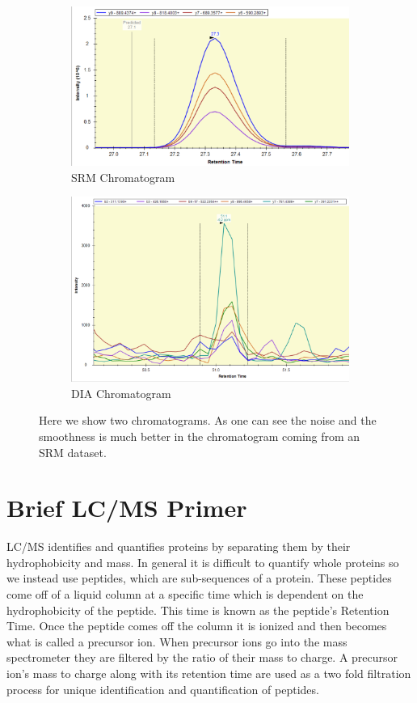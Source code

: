 \documentclass[12pt]{article}
\begin{document}
\begin{figure}
\centering
\begin{subfigure}{.5\textwidth}
  \centering
  \includegraphics[width=1\linewidth]{smoothExample.png}
  \caption{SRM Chromatogram}
  \label{fig:sub1}
\end{subfigure}%
\begin{subfigure}{.5\textwidth}
  \centering
  \includegraphics[width=1\linewidth]{DIA_example}
  \caption{DIA Chromatogram}
  \label{fig:sub2}
\end{subfigure}
\caption{Here we show two chromatograms. As one can see the noise and the smoothness is much better in the chromatogram coming from an SRM dataset.}
\label{fig:test}
\end{figure}

\section{Brief LC/MS Primer}
LC/MS identifies and quantifies proteins by separating them by their hydrophobicity and mass. In general it is difficult to quantify whole proteins so we instead use peptides, which are sub-sequences of a protein. These peptides come off of a liquid column at a specific time which is dependent on the hydrophobicity of the peptide. This time is known as the peptide's Retention Time. Once the peptide comes off the column it is ionized and then becomes what is called a precursor ion. When precursor ions go into the mass spectrometer they are filtered by the ratio of their mass to charge. A precursor ion's mass to charge along with its retention time are used as a two fold filtration process for unique identification and quantification of peptides. 
\end{document}
